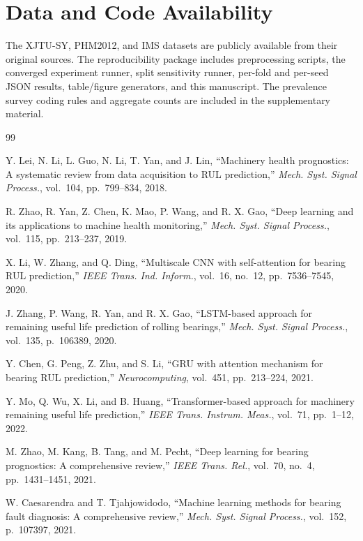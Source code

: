 \documentclass[5p,twocolumn]{elsarticle}
\begin{document}
\section*{Data and Code Availability}
The XJTU-SY, PHM2012, and IMS datasets are publicly available from their original sources. The reproducibility package includes preprocessing scripts, the converged experiment runner, split sensitivity runner, per-fold and per-seed JSON results, table/figure generators, and this manuscript. The prevalence survey coding rules and aggregate counts are included in the supplementary material.



\begin{thebibliography}{99}

Y. Lei, N. Li, L. Guo, N. Li, T. Yan, and J. Lin,
``Machinery health prognostics: A systematic review from data acquisition to RUL prediction,''
\textit{Mech. Syst. Signal Process.}, vol.~104, pp.~799--834, 2018.

R. Zhao, R. Yan, Z. Chen, K. Mao, P. Wang, and R. X. Gao,
``Deep learning and its applications to machine health monitoring,''
\textit{Mech. Syst. Signal Process.}, vol.~115, pp.~213--237, 2019.

X. Li, W. Zhang, and Q. Ding,
``Multiscale CNN with self-attention for bearing RUL prediction,''
\textit{IEEE Trans. Ind. Inform.}, vol.~16, no.~12, pp.~7536--7545, 2020.

J. Zhang, P. Wang, R. Yan, and R. X. Gao,
``LSTM-based approach for remaining useful life prediction of rolling bearings,''
\textit{Mech. Syst. Signal Process.}, vol.~135, p.~106389, 2020.

Y. Chen, G. Peng, Z. Zhu, and S. Li,
``GRU with attention mechanism for bearing RUL prediction,''
\textit{Neurocomputing}, vol.~451, pp.~213--224, 2021.

Y. Mo, Q. Wu, X. Li, and B. Huang,
``Transformer-based approach for machinery remaining useful life prediction,''
\textit{IEEE Trans. Instrum. Meas.}, vol.~71, pp.~1--12, 2022.

M. Zhao, M. Kang, B. Tang, and M. Pecht,
``Deep learning for bearing prognostics: A comprehensive review,''
\textit{IEEE Trans. Rel.}, vol.~70, no.~4, pp.~1431--1451, 2021.

W. Caesarendra and T. Tjahjowidodo,
``Machine learning methods for bearing fault diagnosis: A comprehensive review,''
\textit{Mech. Syst. Signal Process.}, vol.~152, p.~107397, 2021.


\end{thebibliography}
\end{document}
